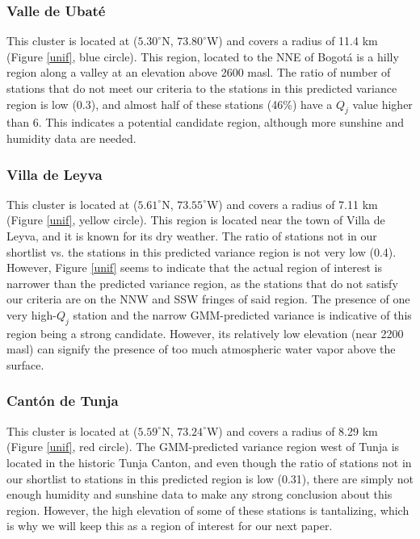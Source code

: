 \documentclass[a4paper,fleqn,usenatbib]{mnras}
\begin{document}
\subsubsection{Valle de Ubat\'e}

This cluster is located at ($5.30^\circ$N, $73.80^\circ$W) and covers a radius of 11.4 km (Figure \ref{unif}, blue circle). This region, located to the NNE of Bogot\'a is a hilly region along a valley at an elevation above 2600 masl. The ratio of number of stations that do not meet our criteria to the stations in this predicted variance region is low (0.3), and almost half of these stations (46\%) have a $Q_j$ value higher than 6. This indicates a potential candidate region, although more  sunshine and humidity data are needed.

\subsubsection{Villa de Leyva}

This cluster is located at ($5.61^\circ$N, $73.55^\circ$W) and covers a radius of 7.11 km (Figure \ref{unif}, yellow circle). This region is located near the town of Villa de Leyva, and it is known for its dry weather.  The ratio of stations not in our shortlist vs. the stations in this predicted variance region is not very low (0.4). However, Figure \ref{unif} seems to indicate that the actual region of interest is narrower than the predicted variance region, as the stations that do not satisfy our criteria are on the NNW and SSW fringes of said region. The presence of one very high-$Q_j$ station and the narrow GMM-predicted variance is indicative of this region being a strong candidate. However, its relatively low elevation (near 2200 masl) can signify the presence of too much atmospheric water vapor above the surface. 

\subsubsection{Cant\'on de Tunja}

This cluster is located at ($5.59^\circ$N, $73.24^\circ$W) and covers a radius of 8.29 km (Figure \ref{unif}, red circle). The GMM-predicted variance region west of Tunja is located in the historic Tunja Canton, and even though the ratio of stations not in our shortlist to stations in this predicted region is low (0.31), there are simply not enough humidity and sunshine data to make any strong conclusion about this region. However, the high elevation of some of these stations is tantalizing, which is why we will keep this as a region of interest for our next paper.
\end{document}
